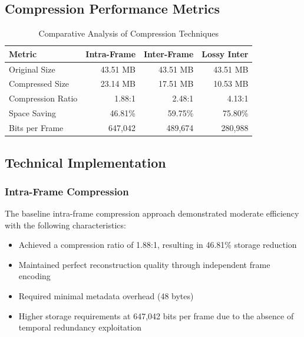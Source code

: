 \documentclass[a4paper,14pt]{article}
\begin{document}
\subsection{Compression Performance Metrics}
\begin{table}[H]
\centering
\begin{tabular}{|l|r|r|r|}
\hline
\textbf{Metric} & \textbf{Intra-Frame} & \textbf{Inter-Frame} & \textbf{Lossy Inter} \\
\hline
Original Size & 43.51 MB & 43.51 MB & 43.51 MB \\
Compressed Size & 23.14 MB & 17.51 MB & 10.53 MB \\
Compression Ratio & 1.88:1 & 2.48:1 & 4.13:1 \\
Space Saving & 46.81\% & 59.75\% & 75.80\% \\
Bits per Frame & 647,042 & 489,674 & 280,988 \\
\hline
\end{tabular}
\caption{Comparative Analysis of Compression Techniques}
\label{tab:compression_metrics}
\end{table}

\subsection{Technical Implementation}

\subsubsection{Intra-Frame Compression}
The baseline intra-frame compression approach demonstrated moderate efficiency with the following characteristics:
\begin{itemize}
    \item Achieved a compression ratio of 1.88:1, resulting in 46.81\% storage reduction
    \item Maintained perfect reconstruction quality through independent frame encoding
    \item Required minimal metadata overhead (48 bytes)
    \item Higher storage requirements at 647,042 bits per frame due to the absence of temporal redundancy exploitation
\end{itemize}
\end{document}
